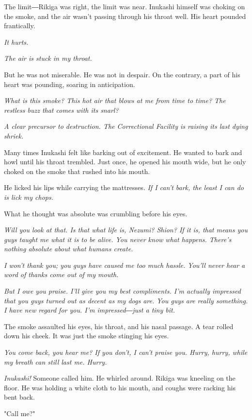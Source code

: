 The limit―Rikiga was right, the limit was near. Inukashi himself was
choking on the smoke, and the air wasn't passing through his throat
well. His heart pounded frantically.

\emph{It hurts.}

\emph{The air is stuck in my throat.}

But he was not miserable. He was not in despair. On the contrary, a part
of his heart was pounding, soaring in anticipation.

\emph{What is this smoke? This hot air that blows at me from time to time? The
restless buzz that comes with its snarl?}

\emph{A clear precursor to destruction. The Correctional Facility is raising
its last dying shriek.}

Many times Inukashi felt like barking out of excitement. He wanted to
bark and howl until his throat trembled. Just once, he opened his mouth
wide, but he only choked on the smoke that rushed into his mouth.

He licked his lips while carrying the mattresses. \emph{If I can't bark, the
least I can do is lick my chops.}

What he thought was absolute was crumbling before his eyes.

\emph{Will you look at that. Is that what life is, Nezumi? Shion? If it is,
that means you guys taught me what it is to be alive. You never know
what happens. There's nothing absolute about what humans create.}

\emph{I won't thank you; you guys have caused me too much hassle. You'll never
hear a word of thanks come out of my mouth.}

\emph{But I owe you praise. I'll give you my best compliments. I'm actually
impressed that you guys turned out as decent as my dogs are. You guys
are really something. I have new regard for you. I'm impressed―just a
tiny bit.}

The smoke assaulted his eyes, his throat, and his nasal passage. A tear
rolled down his cheek. It was just the smoke stinging his eyes.

\emph{You come back, you hear me? If you don't, I can't praise you. Hurry,
hurry, while my breath can still last me. Hurry.}

\emph{Inukashi!} Someone called him. He whirled around. Rikiga was kneeling on
the floor. He was holding a white cloth to his mouth, and coughs were
racking his bent back.

"Call me?"

